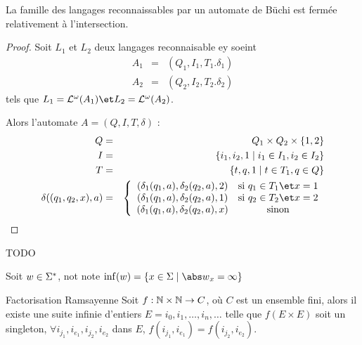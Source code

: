 \begin{prop}
	La famille des langages reconnaissables par un automate de Büchi est fermée relativement à l'intersection.
\end{prop}

\begin{proof}
	Soit $L_1$ et $L_2$ deux langages reconnaisable ey soeint
	\begin{eqnarray*}
		A_1 &=& (Q_1,I_1,T_1.\delta_1) \\
		A_2 &=& (Q_2,I_2,T_2.\delta_2)
	\end{eqnarray*}
	tels que $L_1 = \La ^ {\omega} (A_1) \et  L_2 = \La ^ {\omega} (A_2)$.

	Alors l'automate $A = (Q,I,T,\delta)$ :
	\begin{eqnarray*}
		Q &=& Q_1 \times Q_2 \times \set{1,2}  \\
		I &=& \setdef {i_1,i_2,1} {i_1 \in I_1,i_2 \in I_2 } \\
		T &=&  \setdef {t,q,1} {t \in T_1, q \in Q} \\
		\delta ((q_1,q_2,x), a) &=&
		\left\{
		\begin{array}{cc}
			(\delta_1(q_1,a), \delta_2 (q_2,a), 2) & \text {si } q_1 \in T_1 \et x = 1 \\
			(\delta_1(q_1,a), \delta_2 (q_2,a), 1) & \text {si } q_2 \in T_2 \et x = 2 \\
			(\delta_1(q_1,a), \delta_2 (q_2,a), x) & \text {sinon}
		\end{array}
		\right.
	\end{eqnarray*}
\end{proof}

\begin{exemple}
	TODO
\end{exemple}

\begin{notation}
	Soit $w \in \Sigma^{*}$, not note $\inf (w) = \setdef {x \in \alphabet} {{\abs w}_x = \infty}$
\end{notation}



\begin{theorem}{Factorisation Ramsayenne}
	Soit $f : \mathbb{N} \times \mathbb{N} \to C $, où $C$ est un ensemble fini, alors il existe une suite infinie d'entiers $E = i_0, i_1, \ldots, i_n, \ldots$
	telle que $f(E \times E)$ soit un singleton, \ie $\forall i_{j_1},i_{e_1},i_{j_2},i_{e_2}$ dans $E$, $f(i_{j_1},i_{e_1})=f(i_{j_2},i_{e_2})$.
\end{theorem}

